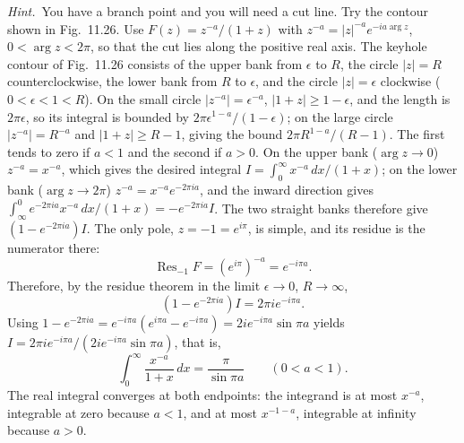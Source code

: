 \emph{Hint.}~You have a branch point and you will need a cut line. Try the
contour shown in Fig.~11.26.
\solution
Use $F(z)=z^{-a}/(1+z)$ with
$z^{-a}=|z|^{-a}e^{-ia\arg z}$, $0<\arg z<2\pi$, so that the cut lies
along the positive real axis. The keyhole contour of Fig.~11.26
consists of the upper bank from $\epsilon$ to $R$, the circle $|z|=R$
counterclockwise, the lower bank from $R$ to $\epsilon$, and the
circle $|z|=\epsilon$ clockwise ($0<\epsilon<1<R$). On the small
circle $|z^{-a}|=\epsilon^{-a}$, $|1+z|\ge1-\epsilon$, and the length
is $2\pi\epsilon$, so its integral is bounded by
$2\pi\epsilon^{1-a}/(1-\epsilon)$; on the large circle
$|z^{-a}|=R^{-a}$ and $|1+z|\ge R-1$, giving the bound
$2\pi R^{1-a}/(R-1)$. The first tends to zero if $a<1$ and
the second if $a>0$. On the upper bank ($\arg z\to0$) $z^{-a}=x^{-a}$,
which gives the desired integral $I=\int_0^\infty x^{-a}\,dx/(1+x)$;
on the lower bank ($\arg z\to2\pi$)
$z^{-a}=x^{-a}e^{-2\pi ia}$, and the inward direction gives
$\int_\infty^0e^{-2\pi ia}x^{-a}\,dx/(1+x)=-e^{-2\pi ia}I$. The two
straight banks therefore give $(1-e^{-2\pi ia})I$. The only pole,
$z=-1=e^{i\pi}$, is simple, and its residue is the numerator there:
\[
\operatorname{Res}_{-1}F=(e^{i\pi})^{-a}=e^{-i\pi a}.
\]
Therefore, by the residue theorem in the limit $\epsilon\to0$,
$R\to\infty$,
\[
(1-e^{-2\pi ia})I=2\pi i e^{-i\pi a}.
\]
Using $1-e^{-2\pi ia}=e^{-i\pi a}(e^{i\pi a}-e^{-i\pi a})
=2ie^{-i\pi a}\sin\pi a$ yields
$I=2\pi ie^{-i\pi a}/(2ie^{-i\pi a}\sin\pi a)$, that is,
\[
\boxed{\int_0^\infty\frac{x^{-a}}{1+x}\,dx
=\frac{\pi}{\sin\pi a}\qquad(0<a<1)}.
\]
The real integral converges at both endpoints: the integrand is at
most $x^{-a}$, integrable at zero because $a<1$, and at most
$x^{-1-a}$, integrable at infinity because $a>0$.

